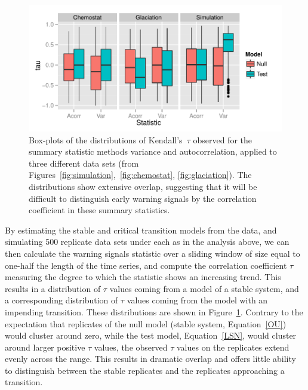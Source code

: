 \documentclass[authoryear,review,11pt]{elsarticle}
\begin{document}
 \begin{figure}
   \begin{center}
     \includegraphics[width=\linewidth]{figures/summary_box.pdf}
     \caption{Box-plots of the distributions of Kendall's~$\tau$ observed for the summary statistic methods variance and autocorrelation, applied to three different data sets (from Figures~\ref{fig:simulation},~\ref{fig:chemostat}, \ref{fig:glaciation}).  The distributions show extensive overlap, suggesting that it will be difficult to distinguish early warning signals by the correlation coefficient in these summary statistics.}
     \label{fig:summary_box}
  \end{center}
 \end{figure}



By estimating the stable and critical transition models from the data,
and simulating 500 replicate data sets under each as in the analysis above,
we can then calculate the warning signals statistic over a sliding window
of size equal to one-half the length of the time series,
and compute the correlation coefficient $\tau$ measuring the degree to which the statistic shows an increasing trend.
This results in a distribution of $\tau$ values coming from a model of a stable system,
and a corresponding distribution of $\tau$ values coming from the model with an impending transition.
These distributions are shown in Figure~\ref{fig:summary_box}.
Contrary to the expectation that replicates of the null model (stable system, Equation~\eqref{OU}) would cluster around zero, 
while the test model, Equation~\eqref{LSN}, would cluster around larger positive $\tau$ values, 
the observed $\tau$ values on the replicates extend evenly across the range.  
This results in dramatic overlap and offers little ability to distinguish between the stable replicates 
and the replicates approaching a transition. 
\end{document}
